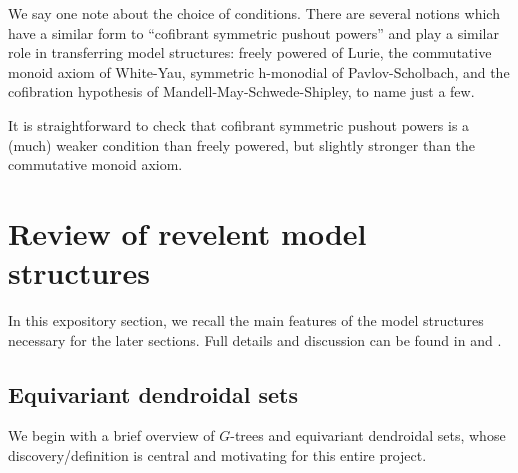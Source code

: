 \documentclass[a4paper,10pt
,draft
]{article}%
\renewcommand{\1}{\eta}%
\begin{document}
{  \begin{remark}
        We say one note about the choice of conditions. There are several notions which have a similar form to
        ``cofibrant symmetric pushout powers'' and play a similar role in transferring model structures:
        freely powered of Lurie,
        the commutative monoid axiom of White-Yau,
        symmetric h-monodial of Pavlov-Scholbach,
        and the cofibration hypothesis of Mandell-May-Schwede-Shipley,
        to name just a few.

        It is straightforward to check that cofibrant symmetric pushout powers is a (much) weaker condition than freely powered,
        but slightly stronger than the commutative monoid axiom.

  \end{remark}


} %








\newpage

\section{Review of revelent model structures}

In this expository section, we recall the main features of the model structures necessary for the later sections.
Full details and discussion can be found in \cite{BP_edss} and \cite{Per_eds}.

\subsection{Equivariant dendroidal sets}
\label{EDS_SEC}

We begin with a brief overview of $G$-trees and equivariant dendroidal sets, whose discovery/definition is central and motivating for this entire project.
\end{document}
